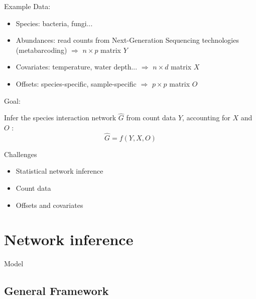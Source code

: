 \documentclass[11pt]{beamer}
\newcommand{\emphase}[1]{\textcolor{Complement}{#1}}
\newcommand{\bleu}[1]{\textcolor{Framableulight}{#1}}
\begin{document}
\begin{frame}{Example}
\Large{\bleu{Data:}}\\ \normalsize{}
	\begin{itemize}
	\item \emphase{Species}: bacteria, fungi...
	\item \emphase{Abundances}: read counts from Next-Generation Sequencing technologies (metabarcoding) $\Rightarrow$ \bleu{$n\times p$ matrix $Y$}
	\item \emphase{Covariates}: temperature, water depth...  $\Rightarrow$  \bleu{$n\times d$ matrix $X$}
	\item \emphase{Offsets}: species-specific, sample-specific  $\Rightarrow$ \bleu{$p\times p$ matrix $O$}\bigskip
\end{itemize}
\Large{\bleu{Goal:}}\normalsize{}

	Infer the \emphase{species interaction network} $\widehat{G}$ from count data $Y$, accounting for $X$ and $O$ : $$\widehat{G}=f(Y,X,O)$$

\end{frame}
\begin{frame}{Challenges}\large{
	\begin{itemize}
	\item  Statistical network inference \bigskip\bigskip
	\item Count data \bigskip\bigskip
	\item Offsets and covariates
\end{itemize}}
\end{frame}

\section{Network inference}
\begin{frame}
\begin{center}
\huge{\bleu{Model}}
\end{center}
\end{frame}
\subsection{General Framework}
\end{document}
